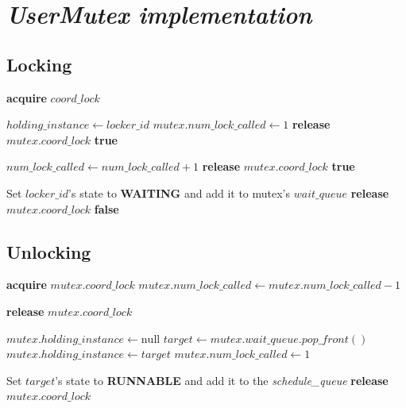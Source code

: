 \documentclass[a4paper,12pt,fleqn]{article}
\begin{document}
\section{\textit{UserMutex implementation}}
\subsection{Locking}
\begin{algorithmic}[1]
    \State \textbf{acquire} $coord\_lock$
    
        \State $holding\_instance \gets locker\_id$
        \State $mutex.num\_lock\_called \gets 1$
        \State \textbf{release} $mutex.coord\_lock$
        \State \Return \textbf{true}
    \EndIf

        \State $num\_lock\_called \gets num\_lock\_called + 1$
        \State \textbf{release} $mutex.coord\_lock$
        \State \Return \textbf{true}
    \EndIf

    \State Set $locker\_id$'s state to \textbf{WAITING} and add it to mutex's $wait\_queue$
    \State \textbf{release} $mutex.coord\_lock$
    \State \Return \textbf{false}
\EndProcedure
\end{algorithmic}
\subsection{Unlocking}
\begin{algorithmic}[1]
    \State \textbf{acquire} $mutex.coord\_lock$
    \State $mutex.num\_lock\_called \gets mutex.num\_lock\_called - 1$
    
        \State \textbf{release} $mutex.coord\_lock$
        \State \Return
    \EndIf

        \State $mutex.holding\_instance \gets \text{null}$
    \Else
        \State $target \gets mutex.wait\_queue.pop\_front()$
        \State $mutex.holding\_instance \gets target$
        \State $mutex.num\_lock\_called \gets 1$
        
        \State Set $target$'s state to \textbf{RUNNABLE} and add it to the \textit{schedule\_queue}
    \EndIf
    \State \textbf{release} $mutex.coord\_lock$
\EndProcedure
\end{algorithmic}
\end{document}
